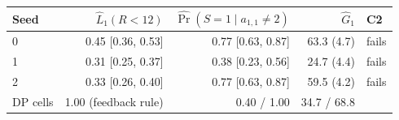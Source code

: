 \begin{tabular}{lrrrl}
\toprule
Seed & $\hat L_1(R<12)$ & $\widehat{\Pr}(S=1\mid a_{1,1}\ne 2)$ & $\hat G_1$ & C2 \\
\midrule
0 & 0.45 [0.36, 0.53] & 0.77 [0.63, 0.87] & 63.3 (4.7) & fails \\
1 & 0.31 [0.25, 0.37] & 0.38 [0.23, 0.56] & 24.7 (4.4) & fails \\
2 & 0.33 [0.26, 0.40] & 0.77 [0.63, 0.87] & 59.5 (4.2) & fails \\
\midrule
DP cells & 1.00 (feedback rule) & 0.40 / 1.00 & 34.7 / 68.8 & \\
\bottomrule
\end{tabular}
